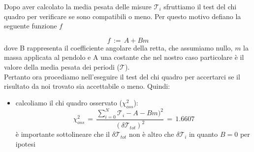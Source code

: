 Dopo aver calcolato la media pesata delle misure $\mathcal{T}_i$ sfruttiamo il test del chi quadro per verificare se sono compatibili o meno. Per questo motivo defiano la seguente funzione $f$

\begin{equation}
	f \,:=\, A + B m 
\end{equation}
%
dove B rappresenta il coefficiente angolare della retta, che assumiamo nullo, $m$ la massa applicata al pendolo e A una costante che nel nostro caso particolare è il valore della media pesata dei periodi ($\mathcal{T}$).\\
Pertanto ora procediamo nell'eseguire il test del chi quadro per accertarci se il risultato da noi trovato sia accettabile o meno. Quindi:
\begin{itemize}
	\item{calcoliamo il chi quadro osservato ($\chi_{oss}^2$):
			\begin{equation*}
				\chi_{oss}^2 \,=\, \frac{\sum_{i=0}^{N} \mathcal{T}_i - A - B m)^2}{(\delta \mathcal{T}_{tot})^2} \,=\, 1.6607
			\end{equation*}
			è importante sottolineare che il $\delta \mathcal{T}_{tot}$ non è altro che $\delta \mathcal{T}_i$ in quanto $B = 0$ per ipotesi
			}
\end{itemize}